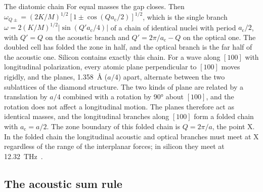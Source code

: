\begin{workedexample}{The diatomic chain}
For equal masses the gap closes. Then $\omega_{Q\pm} = (2K/M)^{1/2}[1 \pm \cos(Qa_{\mathrm{c}}/2)]^{1/2}$, which is the single branch $\omega = 2(K/M)^{1/2}|\sin(Q'a_{\mathrm{c}}/4)|$ of a chain of identical nuclei with period $a_{\mathrm{c}}/2$, with $Q' = Q$ on the acoustic branch and $Q' = 2\pi/a_{\mathrm{c}} - Q$ on the optical one. The doubled cell has folded the zone in half, and the optical branch is the far half of the acoustic one. Silicon contains exactly this chain. For a wave along $[100]$ with longitudinal polarization, every atomic plane perpendicular to $[100]$ moves rigidly, and the planes, \SI{1.358}{\angstrom} ($a/4$) apart, alternate between the two sublattices of the diamond structure. The two kinds of plane are related by a translation by $a/4$ combined with a rotation by \ang{90} about $[100]$, and the rotation does not affect a longitudinal motion. The planes therefore act as identical masses, and the longitudinal branches along $[100]$ form a folded chain with $a_{\mathrm{c}} = a/2$. The zone boundary of this folded chain is $Q = 2\pi/a$, the point X. In the folded chain the longitudinal acoustic and optical branches must meet at X regardless of the range of the interplanar forces; in silicon they meet at \SI{12.32}{THz}~\cite{nilsson1972study}.
\end{workedexample}

\subsection{The acoustic sum rule}

